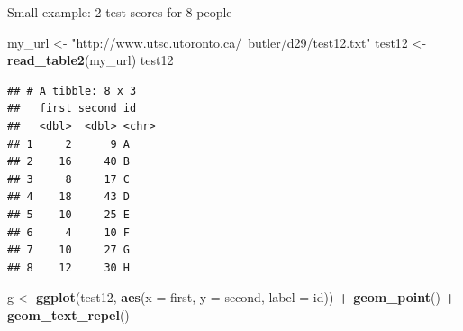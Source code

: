 \documentclass[ignorenonframetext,]{beamer}
\newenvironment{Shaded}{\begin{snugshade}}{\end{snugshade}}
\newcommand{\DataTypeTok}[1]{\textcolor[rgb]{0.13,0.29,0.53}{#1}}
\newcommand{\KeywordTok}[1]{\textcolor[rgb]{0.13,0.29,0.53}{\textbf{#1}}}
\newcommand{\NormalTok}[1]{#1}
\newcommand{\OperatorTok}[1]{\textcolor[rgb]{0.81,0.36,0.00}{\textbf{#1}}}
\newcommand{\StringTok}[1]{\textcolor[rgb]{0.31,0.60,0.02}{#1}}
\begin{document}
\begin{frame}[fragile]{Small example: 2 test scores for 8 people}
\protect\hypertarget{small-example-2-test-scores-for-8-people}{}

\small

\begin{Shaded}
\begin{Highlighting}[]
\NormalTok{my_url <-}\StringTok{ "http://www.utsc.utoronto.ca/~butler/d29/test12.txt"}
\NormalTok{test12 <-}\StringTok{ }\KeywordTok{read_table2}\NormalTok{(my_url)}
\NormalTok{test12}
\end{Highlighting}
\end{Shaded}

\begin{verbatim}
## # A tibble: 8 x 3
##   first second id   
##   <dbl>  <dbl> <chr>
## 1     2      9 A    
## 2    16     40 B    
## 3     8     17 C    
## 4    18     43 D    
## 5    10     25 E    
## 6     4     10 F    
## 7    10     27 G    
## 8    12     30 H
\end{verbatim}

\begin{Shaded}
\begin{Highlighting}[]
\NormalTok{g <-}\StringTok{ }\KeywordTok{ggplot}\NormalTok{(test12, }\KeywordTok{aes}\NormalTok{(}\DataTypeTok{x =}\NormalTok{ first, }\DataTypeTok{y =}\NormalTok{ second, }\DataTypeTok{label =}\NormalTok{ id)) }\OperatorTok{+}
\StringTok{  }\KeywordTok{geom_point}\NormalTok{() }\OperatorTok{+}\StringTok{ }\KeywordTok{geom_text_repel}\NormalTok{()}
\end{Highlighting}
\end{Shaded}

\normalsize

\end{frame}
\end{document}
